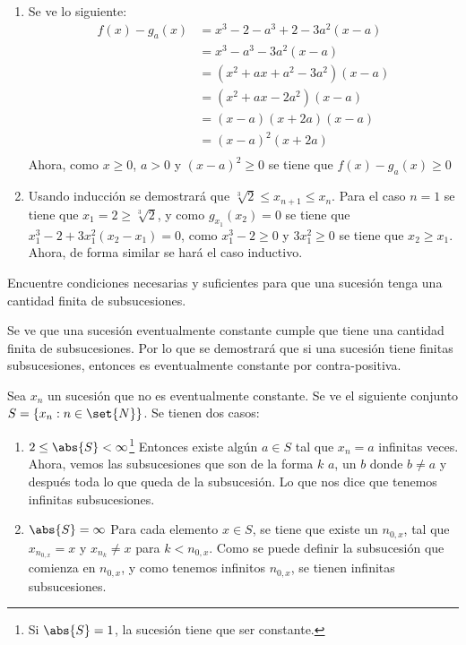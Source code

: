 \documentclass{ayudantia}
\begin{document}
\begin{ans}
    \begin{sol}
        \begin{enumerate}[label=(\alph*)]
            \item Se ve lo siguiente:
            \begin{align*}
                f(x)-g_a(x)&=x^3-2-a^3+2-3a^2(x-a)\\
                &=x^3-a^3-3a^2(x-a)\\
                &=(x^2+ax+a^2-3a^2)(x-a)\\
                &=(x^2+ax-2a^2)(x-a)\\
                &=(x-a)(x+2a)(x-a)\\
                &=(x-a)^2(x+2a)\\
            \end{align*}
            Ahora, como \(x\geq0\), \(a>0\) y \((x-a)^2\geq0\) se tiene que \(f(x)-g_a(x)\geq0\)
            \item Usando inducción se demostrará que \(\sqrt[3]{2}\leq x_{n+1}\leq x_n\). Para el caso \(n=1\) se tiene que \(x_1=2\geq\sqrt[3]{2}\), y como \(g_{x_1}(x_2)=0\) se tiene que \(x_1^3-2+3x_1^2(x_2-x_1)=0\), como \(x_1^3-2\geq0\) y \(3x_1^2\geq0\) se tiene que \(x_2\geq x_1\). Ahora, de forma similar se hará el caso inductivo.
        \end{enumerate}
    \end{sol}
\end{ans}


\begin{prob}
    Encuentre condiciones necesarias y suficientes para que una sucesión tenga una cantidad finita de subsucesiones.
\end{prob}

\begin{ans}
    \begin{sol}
        Se ve que una sucesión eventualmente constante cumple que tiene una cantidad finita de subsucesiones. Por lo que se demostrará que si una sucesión tiene finitas subsucesiones, entonces es eventualmente constante por contra-positiva.

        Sea \(x_n\) un sucesión que no es eventualmente constante. Se ve el siguiente conjunto \(S=\{x_n : n\in\set{N}\}\). Se tienen dos casos:
        \begin{enumerate}[label={Caso \arabic*:}]
            \item \(2\leq\abs{S}<\infty\)\footnote{Si \(\abs{S}=1\), la sucesión tiene que ser constante.} Entonces existe algún \(a\in S\) tal que \(x_n=a\) infinitas veces. Ahora, vemos las subsucesiones que son de la forma \(k\) \(a\), un \(b\) donde \(b\neq a\) y después toda lo que queda de la subsucesión. Lo que nos dice que tenemos infinitas subsucesiones.
            \item \(\abs{S}=\infty\) Para cada elemento \(x\in S\), se tiene que existe un \(n_{0,x}\), tal que \(x_{n_{0,x}}=x\) y \(x_{n_k}\neq x\) para \(k<n_{0,x}\). Como se puede definir la subsucesión que comienza en \(n_{0,x}\), y como tenemos infinitos \(n_{0,x}\), se tienen infinitas subsucesiones.
        \end{enumerate}
    \end{sol}
\end{ans}
\end{document}
